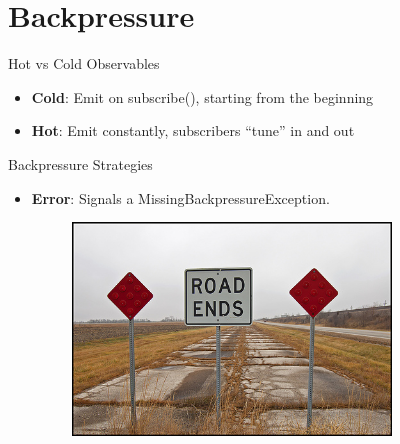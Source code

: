 \section{Backpressure}\label{sec:backpressure}

\begin{frame}{{}}
    \centering
    \Large
    Hot vs Cold Observables
\end{frame}

\begin{frame}{{}}
    \begin{itemize}
    	\item \textbf{Cold}: Emit on subscribe(), starting from the beginning
    	\item \textbf{Hot}: Emit constantly, subscribers \enquote{tune} in and out
    \end{itemize}
\end{frame}

\begin{frame}{Backpressure Strategies}
	\begin{itemize}
		\item \textbf{Error}: Signals a MissingBackpressureException. %
        \begin{figure}[h]
			\includegraphics[width=0.8\textwidth,page=1]{gfx/roadend.jpg}
		\end{figure}
    \end{itemize}
\end{frame}

